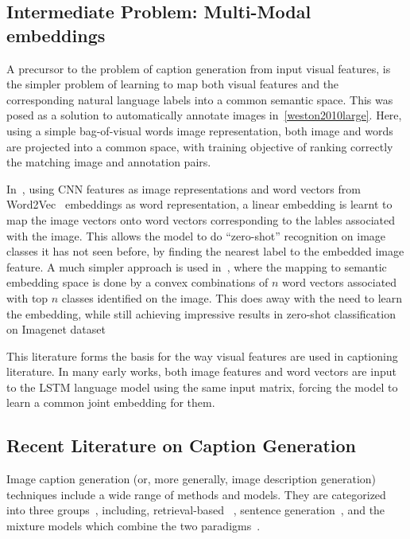 \subsection{Intermediate Problem: Multi-Modal embeddings}
A precursor to the problem of caption generation from input visual features, is
the simpler problem of learning to map both visual features and the
corresponding natural language labels into a common semantic space.
This was posed as a solution to automatically annotate images
in~\ref{weston2010large}.
Here, using a simple bag-of-visual words image representation, both image and
words are projected into a common space, with training objective of ranking
correctly the matching image and annotation pairs. 

In~\cite{frome2013devise}, using CNN features as image representations and
word vectors from Word2Vec~\cite{mikolov2013distributed} embeddings as word
representation, a linear embedding is learnt to map the image vectors onto
word vectors corresponding to the lables associated with the image.
This allows the model to do ``zero-shot'' recognition on image classes it has
not seen before, by finding the nearest label to the embedded image feature.
A much simpler approach is used in~\cite{norouzi2013zero}, where the mapping to
semantic embedding space is done by a convex combinations of $n$ word vectors
associated with top $n$ classes identified on the image.
This does away with the need to learn the embedding, while still achieving
impressive results in zero-shot classification on Imagenet dataset

This literature forms the basis for the way visual features are used in
captioning literature.
In many early works, both image features and word vectors are input to the LSTM
language model using the same input matrix, forcing the model to learn a common
joint embedding for them.

\subsection{Recent Literature on Caption Generation}
Image caption generation (or, more generally, image description generation)
techniques include a wide range of methods and models.
They are categorized into three groups~\cite{Bernardi2016}, including,
retrieval-based ~\cite{Farhadi2010,Ordonez2011,Hodosh2013,Karpathy2014},
sentence generation~\cite{Li2011,Elliott2013}, and the mixture models which
combine the two paradigms~\cite{Vinyals_2015_CVPR,Fang2015,Elliott2015}.

